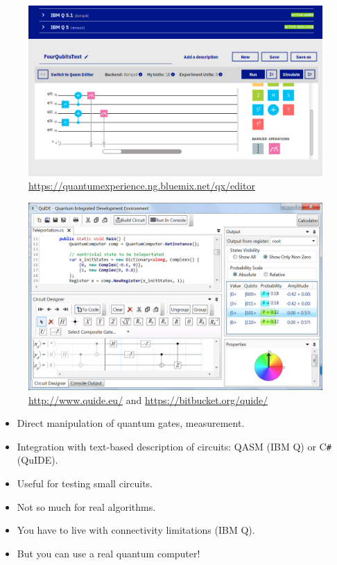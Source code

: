 \documentclass[a4paper,11pt]{article}
\begin{document}
\begin{figure}[ht!]
\centering
\includegraphics[width=\textwidth]{../slides/pics/ibm-q-experience-composer.png}
\caption{\url{https://quantumexperience.ng.bluemix.net/qx/editor}}
\end{figure}

\begin{figure}[ht!]
\centering
\includegraphics[width=\textwidth]{../slides/pics/QuIDE_GUI.jpg}
\caption{\url{http://www.quide.eu/} and 
\url{https://bitbucket.org/quide/}}
\end{figure}
     



\begin{itemize}
\item Direct manipulation of quantum gates, measurement.
\item Integration with text-based description of circuits: QASM 
(IBM Q) or C\texttt{\#} (QuIDE).
\item Useful for testing small circuits.
\item Not so much for real algorithms.
\item You have to live with connectivity limitations (IBM Q).
\item But you can use a real quantum computer!
\end{itemize}
\end{document}
